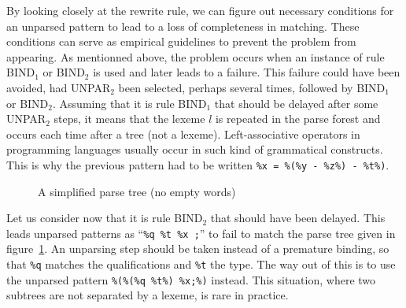 By looking closely at the rewrite rule, we can figure out necessary
conditions for an unparsed pattern to lead to a loss of completeness
in matching. These conditions can serve as empirical guidelines to
prevent the problem from appearing. As mentionned above, the problem
occurs when an instance of rule \textsf{BIND}\(_1\) or
\textsf{BIND}\(_2\) is used and later leads to a failure. This failure
could have been avoided, had \textsf{UNPAR}\(_2\) been selected,
perhaps several times, followed by \textsf{BIND}\(_1\) or
\textsf{BIND}\(_2\). Assuming that it is rule \textsf{BIND}\(_1\) that
should be delayed after some \textsf{UNPAR}\(_2\) steps, it means that
the lexeme \(l\) is repeated in the parse forest and occurs each time
after a tree (not a lexeme). Left\hyp{}associative operators in
programming languages usually occur in such kind of grammatical
constructs. This is why the previous pattern had to be written
\texttt{\%x = \%(\%y - \%z\%) - \%t\%)}.

\begin{figure}[H]
%
\caption{A simplified parse tree (no empty words)\label{fig:const_static}}
\end{figure}

Let us consider now that it is rule \textsf{BIND}\(_2\) that should
have been delayed. This leads unparsed patterns as ``\texttt{\%q \%t
\%x ;}'' to fail to match the parse tree given in
figure~\ref{fig:const_static}. An unparsing step should be taken
instead of a premature binding, so that \texttt{\%q} matches the
qualifications and \texttt{\%t} the type. The way out of this is to
use the unparsed pattern \texttt{\%(\%(\%q \%t\%) \%x;\%)}
instead. This situation, where two subtrees are not separated by a
lexeme, is rare in practice.

